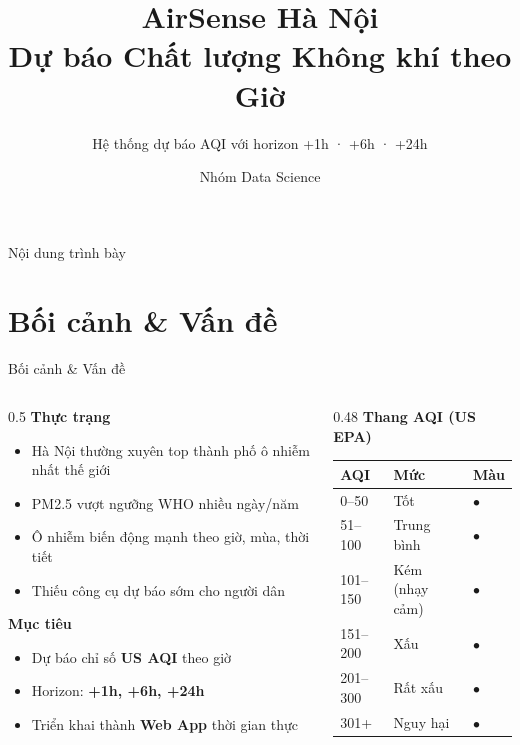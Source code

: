 \documentclass[aspectratio=169]{beamer}
\title[AirSense Hà Nội]{AirSense Hà Nội\\Dự báo Chất lượng Không khí theo Giờ}
\subtitle{Hệ thống dự báo AQI với horizon +1h · +6h · +24h}
\author{Nhóm Data Science}
\institute{Data Science Project · 2026}
\date{}
\newcommand{\good}[1]{{\color{cgood}\textbf{#1}}}
\newcommand{\warn}[1]{{\color{cmoderate}\textbf{#1}}}
\newcommand{\bad}[1]{{\color{cunhealthy}\textbf{#1}}}
\newcommand{\info}[1]{{\color{cblue}\textbf{#1}}}
\begin{document}
\begin{frame}
  \titlepage
\end{frame}

\begin{frame}{Nội dung trình bày}
  \tableofcontents
\end{frame}

\section{Bối cảnh \& Vấn đề}

\begin{frame}{Bối cảnh \& Vấn đề}
  \begin{columns}[T]
    \begin{column}{0.5\textwidth}
      \textbf{Thực trạng}
      \begin{itemize}
        \item Hà Nội thường xuyên top thành phố ô nhiễm nhất thế giới
        \item PM2.5 vượt ngưỡng WHO nhiều ngày/năm
        \item Ô nhiễm biến động mạnh theo giờ, mùa, thời tiết
        \item Thiếu công cụ dự báo sớm cho người dân
      \end{itemize}
      \vspace{0.5em}
      \textbf{Mục tiêu}
      \begin{itemize}
        \item Dự báo chỉ số \info{US AQI} theo giờ
        \item Horizon: \textbf{+1h, +6h, +24h}
        \item Triển khai thành \textbf{Web App} thời gian thực
      \end{itemize}
    \end{column}
    \begin{column}{0.48\textwidth}
      \textbf{Thang AQI (US EPA)}
      \vspace{0.3em}
      \begin{tabular}{lll}
        \toprule
        \textbf{AQI} & \textbf{Mức} & \textbf{Màu} \\
        \midrule
        0--50   & Tốt           & \good{$\bullet$} \\
        51--100 & Trung bình    & \warn{$\bullet$} \\
        101--150 & Kém (nhạy cảm) & {\color{csensitive}$\bullet$} \\
        151--200 & Xấu          & \bad{$\bullet$} \\
        201--300 & Rất xấu      & {\color{cvery}$\bullet$} \\
        301+     & Nguy hại     & {\color{chazard}$\bullet$} \\
        \bottomrule
      \end{tabular}
    \end{column}
  \end{columns}
\end{frame}
\end{document}
